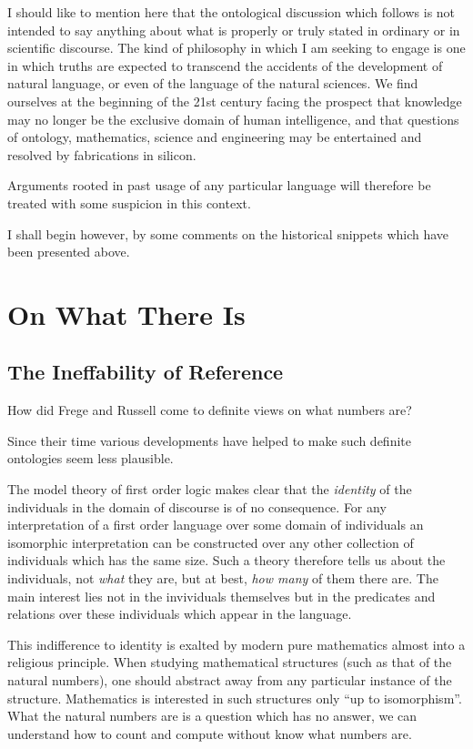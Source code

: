 \documentclass{rbjk}
\begin{document}
\begin{article}
I should like to mention here that the ontological discussion which follows is not intended to say anything about what is properly or truly stated in ordinary or in scientific discourse.
The kind of philosophy in which I am seeking to engage is one in which truths are expected to transcend the accidents of the development of natural language, or even of the language of the natural sciences.
We find ourselves at the beginning of the 21st century facing the prospect that knowledge may no longer be the exclusive domain of human intelligence, and that questions of ontology, mathematics, science and engineering may be entertained and resolved by fabrications in silicon.

Arguments rooted in past usage of any particular language will therefore be treated with some suspicion in this context.

I shall begin however, by some comments on the historical snippets which have been presented above.

\section{On What There Is}

\subsection{The Ineffability of Reference}

How did Frege and Russell come to definite views on what numbers are?

Since their time various developments have helped to make such definite ontologies seem less plausible.

The model theory of first order logic  makes clear that the {\it identity} of the individuals in the domain of discourse is of no consequence.
For any interpretation of a first order language over some domain of individuals an isomorphic interpretation can be constructed over any other collection of individuals which has the same size.
Such a theory therefore tells us about the individuals, not {\it what} they are, but at best, {\it how many} of them there are.
The main interest lies not in the invividuals themselves but in the predicates and relations over these individuals which appear in the language.

This indifference to identity is exalted by modern pure mathematics almost into a religious principle.
When studying mathematical structures (such as that of the natural numbers), one should abstract away from any particular instance of the structure.
Mathematics is interested in such structures only ``up to isomorphism''.
What the natural numbers are is a question which has no answer, we can understand how to count and compute without know what numbers are.


\end{article}
\end{document}
